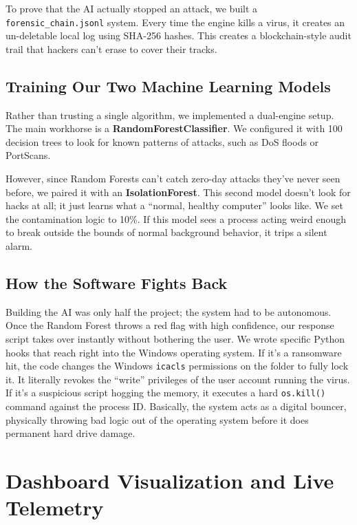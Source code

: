 \documentclass[conference]{IEEEtran}
\begin{document}
To prove that the AI actually stopped an attack, we built a \texttt{forensic\_chain.jsonl} system. Every time the engine kills a virus, it creates an un-deletable local log using SHA-256 hashes. This creates a blockchain-style audit trail that hackers can't erase to cover their tracks.

\subsection{Training Our Two Machine Learning Models}

Rather than trusting a single algorithm, we implemented a dual-engine setup. 
The main workhorse is a \textbf{RandomForestClassifier}. We configured it with 100 decision trees to look for known patterns of attacks, such as DoS floods or PortScans. 

However, since Random Forests can't catch zero-day attacks they've never seen before, we paired it with an \textbf{IsolationForest}. This second model doesn't look for hacks at all; it just learns what a ``normal, healthy computer'' looks like. We set the contamination logic to 10\%. If this model sees a process acting weird enough to break outside the bounds of normal background behavior, it trips a silent alarm. 

\subsection{How the Software Fights Back}

Building the AI was only half the project; the system had to be autonomous. Once the Random Forest throws a red flag with high confidence, our response script takes over instantly without bothering the user. 
We wrote specific Python hooks that reach right into the Windows operating system. If it's a ransomware hit, the code changes the Windows \texttt{icacls} permissions on the folder to fully lock it. It literally revokes the ``write'' privileges of the user account running the virus. If it's a suspicious script hogging the memory, it executes a hard \texttt{os.kill()} command against the process ID. Basically, the system acts as a digital bouncer, physically throwing bad logic out of the operating system before it does permanent hard drive damage.

\section{Dashboard Visualization and Live Telemetry}
\end{document}
